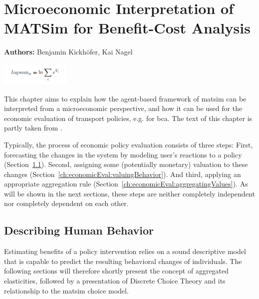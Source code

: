 \chapter{Microeconomic Interpretation of MATSim for Benefit-Cost Analysis}
\label{ch:economicEval}

\hfill \textbf{Authors:} Benjamin Kickhöfer, Kai Nagel

\begin{center} \includegraphics[width=0.25\textwidth, angle=0]{understanding/figures/logsum} \end{center}


This chapter aims to explain how the agent-based framework of \acrshort{matsim} can be interpreted from a microeconomic perspective, and how it can be used for the economic evaluation of transport policies, e.g. for \gls{bca}. The text of this chapter is partly taken from \citet[][Section~2.3]{Kickhoefer_PhDThesis_2014}.

Typically, the process of economic policy evaluation consists of three steps:
%
First, forecasting the changes in the system by modeling user's reactions to a policy (Section~\ref{ch:economicEval:describingBehavior}).
%
Second, assigning some (potentially monetary) valuation to these changes (Section~\ref{ch:economicEval:valuingBehavior}).
%
And third, applying an appropriate aggregation rule (Section~\ref{ch:economicEval:aggregatingValues}).
%
As will be shown in the next sections, these steps are neither completely independent nor completely dependent on each other.

\section{Describing Human Behavior}
\label{ch:economicEval:describingBehavior}
Estimating benefits of a policy intervention relies on a sound descriptive model that is capable to predict the resulting behavioral changes of individuals. The following sections will therefore shortly present the concept of aggregated elasticities, followed by a presentation of Discrete Choice Theory and its relationship to the \acrshort{matsim} choice model.

